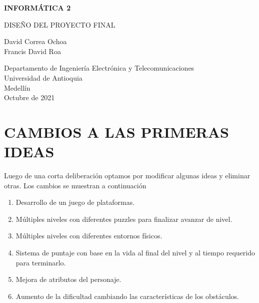 \documentclass{article}
\begin{document}
\begin{titlepage}
    \begin{center}
        \vspace*{1cm}
            
        \huge
        \textbf{INFORMÁTICA 2 }
            
        \vspace{0.5cm}
        \huge
        DISEÑO DEL PROYECTO FINAL
            
        \vspace{1.5cm}
            
        David Correa Ochoa\\
        Francis David Roa    
            
            
        \vfill
            
        \vspace{0.8cm}
            
        \Large
        Departamento de Ingeniería Electrónica y Telecomunicaciones\\
        Universidad de Antioquia\\
        Medellín\\
        Octubre de 2021
            
    \end{center}
\end{titlepage}

\newpage
	\section{CAMBIOS A LAS PRIMERAS IDEAS}
	Luego de una corta deliberación optamos por modificar algunas ideas y eliminar otras. Los cambios se muestran a continuación
	\begin{enumerate}
    \item Desarrollo de un juego de plataformas.
    \item Múltiples niveles con diferentes puzzles para finalizar avanzar de nivel.
    \item Múltiples niveles con diferentes entornos físicos.
    \item Sistema de puntaje con base en la vida al final del nivel y al tiempo requerido para terminarlo.
    \item Mejora de atributos del personaje.
    \item Aumento de la dificultad cambiando las características de los obstáculos.
\end{enumerate}
\end{document}
